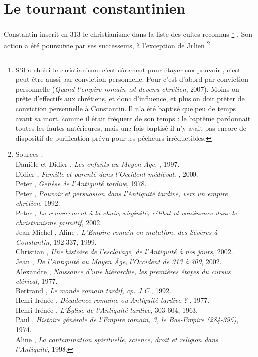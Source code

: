 

\chapter{Le tournant constantinien}


 Constantin inscrit en 313 le christianisme dans la liste des cultes reconnus%
\footnote{S'il a choisi le christianisme c'est sûrement pour étayer son pouvoir , c'est peut-être aussi par conviction personnelle. Pour  c'est d'abord par conviction personnelle (\emph{Quand l'empire romain est devenu chrétien}, 2007). Moins on prête d'effectifs aux chrétiens, et donc d'influence, et plus on doit prêter de conviction personnelle à Constantin. Il n'a été baptisé que peu de temps avant sa mort, comme il était fréquent de son temps : le baptême pardonnait toutes les fautes antérieures, mais une fois baptisé il n'y avait pas encore de dispositif de purification prévu pour les pécheurs irréductibles. }%
. Son action a été poursuivie par ses successeurs, à l'exception de Julien%
\footnote{Sources :
\\Danièle  et Didier , \emph{Les enfants au Moyen Âge, }, 1997.
\\Didier {}, \emph{Famille et parenté dans l'Occident médiéval, }, 2000.
\\Peter {}, \emph{Genèse de l'Antiquité tardive}, 1978.
\\Peter {}, \emph{Pouvoir et persuasion dans l'Antiquité tardive, vers un empire chrétien}, 1992.
\\Peter {}, \emph{Le renoncement à la chair, virginité, célibat et continence dans le christianisme primitif}, 2002.
\\Jean-Michel , Aline , \emph{L'Empire romain en mutation, des Sévères à Constantin}, 192-337, 1999.
\\Christian {}, \emph{Une histoire de l'esclavage, de l'Antiquité à nos jours}, 2002.
\\Jean {}, \emph{De l'Antiquité au Moyen Âge, l'Occident de 313 à 800}, 2002.
\\Alexandre {}, \emph{Naissance d'une hiérarchie, les premières étapes du cursus clérical}, 1977.
\\Bertrand {}, \emph{Le monde romain tardif,  ap. J.C.}, 1992.
\\Henri-Irénée , \emph{Décadence romaine ou Antiquité tardive ? }, 1977.
\\Henri-Irénée , \emph{L'Église de l'Antiquité tardive}, 303-604, 1963.
\\Paul {}, \emph{Histoire générale de l'Empire romain, 3, le Bas-Empire (284-395)}, 1974.
\\Aline {}, \emph{La contamination spirituelle, science, droit et religion dans l'Antiquité}, 1998.}%
